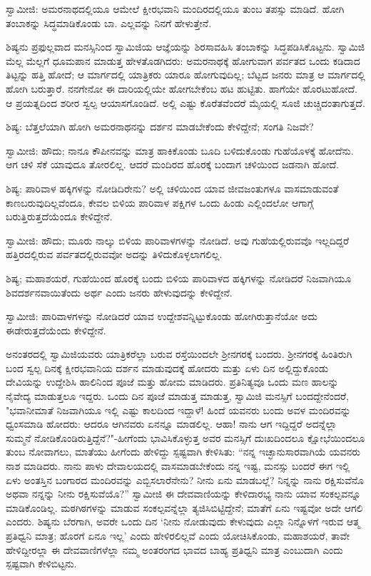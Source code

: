 ಸ್ವಾಮೀಜಿ: ಅಮರನಾಥದಲ್ಲಿಯೂ ಆಮೇಲೆ ಕ್ಷೀರಭವಾನಿ ಮಂದಿರದಲ್ಲಿಯೂ ತುಂಬ ತಪಸ್ಸು ಮಾಡಿದೆ. ಹೋಗಿ ತಂಬಾಕನ್ನು ಸಿದ್ಧಮಾಡಿಕೊಂಡು ಬಾ. ಎಲ್ಲವನ್ನು ನಿನಗೆ ಹೇಳುತ್ತೇನೆ.

ಶಿಷ್ಯನು ಪ್ರಫುಲ್ಲವಾದ ಮನಸ್ಸಿನಿಂದ ಸ್ವಾಮಿಜಿಯ ಆಜ್ಞೆಯನ್ನು ಶಿರಸಾವಹಿಸಿ ತಂಬಾಕನ್ನು ಸಿದ್ಧಪಡಿಸಿಕೊಟ್ಟನು. ಸ್ವಾಮಿಜಿ ಮೆಲ್ಲ ಮೆಲ್ಲಗೆ ಧೂಮಪಾನ ಮಾಡುತ್ತ ಹೇಳತೊಡಗಿದರು: ಅಮರನಾಥಕ್ಕೆ ಹೋಗುವಾಗ ಪರ್ವತದ ಒಂದು ಕಡಿದಾದ ತಿಟ್ಟನ್ನು ಹತ್ತಿ ಹೋದೆ; ಆ ಮಾರ್ಗದಲ್ಲಿ ಯಾತ್ರಿಕರು ಯಾರೂ ಹೋಗುವುದಿಲ್ಲ; ಬೆಟ್ಟದ ಜನರು ಮಾತ್ರ ಆ ಮಾರ್ಗದಲ್ಲಿ ಹೋಗಿ ಬರುತ್ತಾರೆ. ನನಗೇನೋ ಈ ದಾರಿಯಲ್ಲಿಯೇ ಹೋಗಬೇಕೆಂಬ ಹಟ ಹುಟ್ಟಿತು. ಹಾಗೆಯೇ ಹೊರಟುಹೋದೆ. ಆ ಪ್ರಯತ್ನದಿಂದ ಶರೀರ ಸ್ವಲ್ಪ ಆಯಾಸಗೊಂಡಿದೆ. ಅಲ್ಲಿ ಎಷ್ಟು ಕೊರೆತವೆಂದರೆ ಮೈಯಲ್ಲಿ ಸೂಜಿ ಚುಚ್ಚಿದಂತಾಗುತ್ತದೆ.

ಶಿಷ್ಯ: ಬೆತ್ತಲೆಯಾಗಿ ಹೋಗಿ ಅಮರನಾಥನನ್ನು ದರ್ಶನ ಮಾಡಬೇಕೆಂದು ಕೇಳಿದ್ದೇನೆ; ಸಂಗತಿ ನಿಜವೇ?

ಸ್ವಾಮೀಜಿ: ಹೌದು; ನಾನೂ ಕೌಪೀನವನ್ನು ಮಾತ್ರ ಹಾಕಿಕೊಂಡು ಬೂದಿ ಬಳಿದುಕೊಂಡು ಗುಹೆಯೊಳಕ್ಕೆ ಹೋದೆನು. ಆಗ ಚಳಿ ಸೆಕೆ ಯಾವುದೂ ತೋರಲಿಲ್ಲ. ಆದರೆ ಮಂದಿರದ ಹೊರಕ್ಕೆ ಬಂದಾಗ ಚಳಿಯಿಂದ ಜಡನಾಗಿ ಹೋದೆ.

ಶಿಷ್ಯ: ಪಾರಿವಾಳ ಹಕ್ಕಿಗಳನ್ನು ನೋಡಿದಿರೇನು? ಅಲ್ಲಿ ಚಳಿಯಿಂದ ಯಾವ ಜೀವಜಂತುಗಳೂ ವಾಸಮಾಡುವಂತೆ ಕಾಣಬರುವುದಿಲ್ಲವೆಂದೂ, ಕೇವಲ ಬಿಳಿಯ ಪಾರಿವಾಳ ಪಕ್ಷಿಗಳ ಒಂದು ಹಿಂಡು ಎಲ್ಲಿಂದಲೋ ಆಗಾಗ್ಗೆ ಬರುತ್ತಿರುತ್ತದೆಯೆಂದೂ ಕೇಳಿದ್ದೇನೆ.

ಸ್ವಾಮೀಜಿ: ಹೌದು; ಮೂರು ನಾಲ್ಕು ಬಿಳಿಯ ಪಾರಿವಾಳಗಳನ್ನು ನೋಡಿದೆ. ಅವು ಗುಹೆಯಲ್ಲಿರುವವೊ ಇಲ್ಲದಿದ್ದರೆ ಹತ್ತಿರದಲ್ಲಿರುವ ಪರ್ವತದಲ್ಲಿರುವವೋ ಅದನ್ನು ತಿಳಿದುಕೊಳ್ಳಲಾಗಲಿಲ್ಲ.

ಶಿಷ್ಯ; ಮಹಾಶಯರೆ, ಗುಹೆಯಿಂದ ಹೊರಕ್ಕೆ ಬಂದು ಬಿಳಿಯ ಪಾರಿವಾಳದ ಹಕ್ಕಿಗಳನ್ನು ನೋಡಿದರೆ ನಿಜವಾಗಿಯೂ ಶಿವದರ್ಶನವಾಯಿತೆಂದು ಅರ್ಥ ಎಂದು ಜನರು ಹೇಳುವುದನ್ನು ಕೇಳಿದ್ದೇನೆ.

ಸ್ವಾಮೀಜಿ: ಪಾರಿವಾಳಗಳನ್ನು ನೋಡಿದರೆ ಯಾವ ಉದ್ದೇಶವನ್ನಿಟ್ಟುಕೊಂಡು ಹೋಗಿರುತ್ತಾನೆಯೋ ಅದು ಈಡೇರುತ್ತದೆಯೆಂದು ಕೇಳಿದ್ದೇನೆ.

ಅನಂತರದಲ್ಲಿ ಸ್ವಾಮಿಜಿಯವರು ಯಾತ್ರಿಕರೆಲ್ಲಾ ಬರುವ ರಸ್ತೆಯಿಂದಲೇ ಶ‍್ರೀನಗರಕ್ಕೆ ಬಂದರು. ಶ‍್ರೀನಗರಕ್ಕೆ ಹಿಂತಿರುಗಿ ಬಂದ ಸ್ವಲ್ಪ ದಿನಕ್ಕೆ ಕ್ಷೀರಭವಾನಿಯ ದರ್ಶನ ಮಾಡುವುದಕ್ಕೆ ಹೋದರು ಮತ್ತು ಏಳು ದಿನ ಅಲ್ಲಿದ್ದುಕೊಂಡು ದೇವಿಯನ್ನು ಉದ್ದೇಶಿಸಿ ಹಾಲಿನಿಂದ ಪೂಜೆ ಮತ್ತು ಹೋಮ ಮಾಡಿದರು. ಪ್ರತಿನಿತ್ಯವೂ ಒಂದು ಮಣ ಹಾಲನ್ನು ನೈವೇದ್ಯ ಮಾಡುತ್ತಲೂ ಇದ್ದರು. ಒಂದು ದಿನ ಪೂಜೆ ಮಾಡುತ್ತ ಮಾಡುತ್ತ, ಸ್ವಾಮಿಜಿ ಮನಸ್ಸಿಗೆ ಬಂದದ್ದೇನೆಂದರೆ, "ಭವಾನೀಮಾತೆ ನಿಜವಾಗಿಯೂ ಇಲ್ಲಿ ಎಷ್ಟು ಕಾಲದಿಂದ ಇದ್ದಾಳೆ! ಹಿಂದೆ ಯವನರು ಬಂದು ಅವಳ ಮಂದಿರವನ್ನು ಧ್ವಂಸಮಾಡಿ ಹೋದರು: ಆದರೂ ಆಗಿನವರು ಏನನ್ನೂ ಮಾಡಲಿಲ್ಲ. ಆಹಾ! ನಾನು ಆಗ ಇದ್ದಿದ್ದರೆ ಅದನ್ನೆಲ್ಲಾ ಸುಮ್ಮನೆ ನೋಡಿಕೊಂಡಿರುತ್ತಿದ್ದೆನೆ?"-ಹೀಗೆಂದು ಭಾವಿಸಿಕೊಳ್ಳುತ್ತ ಅವರ ಮನಸ್ಸಿಗೆ ದುಃಖದಿಂದಲೂ ಕ್ಷೋಭೆಯಿಂದಲೂ ತುಂಬ ನೋವಾಗಲು, ಮಾತೆಯು ಹೀಗೆಂದು ಹೇಳಿದ್ದು ಸ್ಪಷ್ಟವಾಗಿ ಕೇಳಿಸಿತು: “ನನ್ನ ಇಚ್ಛಾನುಸಾರವಾಗಿಯೆ ಯವನರು ನಾಶ ಮಾಡಿದರು. ನಾನು ಪಾಳು ದೇವಾಲಯದಲ್ಲಿ ವಾಸಮಾಡಬೇಕೆಂದು ನನ್ನ ಇಷ್ಟ, ಮನಸ್ಸು ಬಂದರೆ ಈಗ ಇಲ್ಲಿ ಏಳು ಅಂತಸ್ತಿನ ಬಂಗಾರದ ಮಂದಿರವನ್ನು ಎಬ್ಬಿಸಲಾರೆನೇನು? ನೀನು ಏನು ಮಾಡಬಲ್ಲೆ? ನಿನ್ನನ್ನು ನಾನು ರಕ್ಷಿಸುವೆನೊ ಅಥವಾ ನನ್ನನ್ನು ನೀನು ರಕ್ಷಿಸುವೆಯೊ?” ಸ್ವಾಮೀಜಿ ಈ ದೇವವಾಣಿಯನ್ನು ಕೇಳಿದಾರಭ್ಯ ನಾನು ಯಾವ ಸಂಕಲ್ಪವನ್ನೂ ಮಾಡಿಕೊಂಡಿಲ್ಲ. ಮಠಗಿಠಗಳನ್ನು ಮಾಡುವ ಸಂಕಲ್ಪವನ್ನೆಲ್ಲಾ ತ್ಯಜಿಸಿಬಿಟ್ಟಿದ್ದೇನೆ; ಮಾತೆಗೆ ಏನು ಇಷ್ಟವೋ ಅದೇ ಆಗಲಿ ಎಂದರು. ಶಿಷ್ಯನು ಬೆರಗಾಗಿ, ಅವರೇ ಒಂದು ದಿನ ‘ನೀನು ನೋಡುವುದು ಕೇಳುವುದು ಎಲ್ಲಾ ನಿನ್ನೊಳಗೆ ಇರುವ ಆತ್ಮ ಪ್ರತಿಧ್ವನಿ ಮಾತ್ರ; ಹೊರಗೆ ಏನೂ ಇಲ್ಲ’ ಎಂದು ಹೇಳಿರಲಿಲ್ಲವೆ ಎಂದು ಯೋಚಿಸಿಕೊಂಡು, ಮಹಾಶಯರೆ, ತಾವೇ ಹೇಳಿದ್ದೀರಲ್ಲಾ ಈ ದೇವವಾಣಿಗಳೆಲ್ಲಾ ನಮ್ಮ ಅಂತರಂಗದ ಭಾವದ ಬಾಹ್ಯ ಪ್ರತಿಧ್ವನಿ ಮಾತ್ರ ಎಂಬುದಾಗಿ ಎಂದು ಸ್ಪಷ್ಟವಾಗಿ ಕೇಳಿಬಿಟ್ಟನು.

